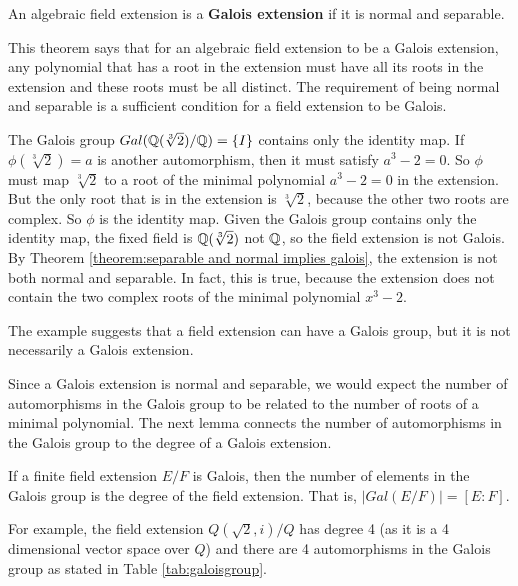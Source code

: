 \documentclass[../main.tex]{subfiles}
\begin{document}
\reversemarginpar
{}
\begin{theorem}
\label{theorem:separable and normal implies galois}
An algebraic field extension is a \textbf{Galois extension} if it is normal and separable. 
\end{theorem}
This theorem says that for an algebraic field extension to be a Galois extension, any polynomial that has a root in the extension must have all its roots in the extension and these roots must be all distinct. The requirement of being normal and separable is a sufficient condition for a field extension to be Galois. %

\begin{example}
The Galois group $Gal(\mathbb{Q}(\sqrt[3]{2})/\mathbb{Q}) = \{I\}$ contains only the identity map. If $\phi(\sqrt[3]{2})=a$ is another automorphism, then it must satisfy $a^3-2=0$. So $\phi$ must map $\sqrt[3]{2}$ to a root of the minimal polynomial $a^3-2=0$ in the extension. But the only root that is in the extension is $\sqrt[3]{2}$, because the other two roots are complex. So $\phi$ is the identity map. Given the Galois group contains only the identity map, the fixed field is $\mathbb{Q}(\sqrt[3]{2})$ not $\mathbb{Q}$, so the field extension is not Galois. By Theorem \ref{theorem:separable and normal implies galois}, the extension is not both normal and separable. In fact, this is true, because the extension does not contain the two complex roots of the minimal polynomial $x^3-2$.
\end{example}

The example suggests that a field extension can have a Galois group, but it is not necessarily a Galois extension. 

Since a Galois extension is normal and separable, we would expect the number of automorphisms in the Galois group to be related to the number of roots of a minimal polynomial. The next lemma connects the number of automorphisms in the Galois group to the degree of a Galois extension. 
\begin{lemma}
If a finite field extension $E/F$ is Galois, then the number of elements in the Galois group is the degree of the field extension. That is, $|Gal(E/F)|=[E:F]$. 
\end{lemma}
For example, the field extension $Q(\sqrt{2},i) / Q$ has degree 4 (as it is a 4 dimensional vector space over $Q$) and there are 4 automorphisms in the Galois group as stated in Table \ref{tab:galoisgroup}. 
\end{document}
